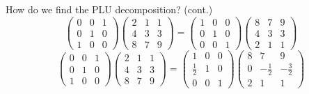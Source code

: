 \documentclass{beamer}
\begin{document}
\begin{frame}{How do we find the PLU decomposition? (cont.)}
    \pause
    \[
        \begin{pmatrix}{}
            0 & 0 & 1 \\
            0 & 1 & 0 \\
            1 & 0 & 0
            \end{pmatrix}\begin{pmatrix}{}
            2 & 1 & 1 \\
            4 & 3 & 3 \\
            8 & 7 & 9
        \end{pmatrix}
        =\begin{pmatrix}{}
            1 & 0 & 0 \\
            0 & 1 & 0 \\
            0 & 0 & 1
        \end{pmatrix}
        \begin{pmatrix}{}
            8 & 7 & 9 \\
            4 & 3 & 3 \\
            2 & 1 & 1
        \end{pmatrix}
    \]
    \pause
    \[
        \begin{pmatrix}{}
            0 & 0 & 1 \\
            0 & 1 & 0 \\
            1 & 0 & 0
            \end{pmatrix}\begin{pmatrix}{}
            2 & 1 & 1 \\
            4 & 3 & 3 \\
            8 & 7 & 9
        \end{pmatrix}
        =\begin{pmatrix}{}
            1 & 0 & 0 \\
            \frac{1}{2} & 1 & 0 \\
            0 & 0 & 1
        \end{pmatrix}
        \begin{pmatrix}{}
            8 & 7 & 9 \\
            0 & -\frac{1}{2} & -\frac{3}{2} \\
            2 & 1 & 1
        \end{pmatrix}
    \]

\end{frame}
\end{document}
